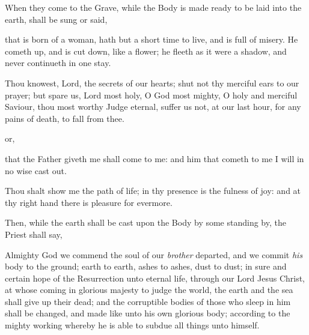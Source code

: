 \begin{rubric}
    When they come to the Grave, while the Body is made ready to be laid into the earth, shall be sung or said,
\end{rubric}\par
{}
 that is born of a woman, hath but a short time to live, and is full of misery. He cometh up, and is cut down, like a flower; he fleeth as it were a shadow, and never continueth in one stay.\par
{}
    Thou knowest, Lord, the secrets of our hearts; shut not thy merciful ears to our prayer; but spare us, Lord most holy, O God most mighty, O holy and merciful Saviour, thou most worthy Judge eternal, suffer us not, at our last hour, for any pains of death, to fall from thee.
\begin{inhead}
    or,
\end{inhead}
 that the Father giveth me shall come to me: and him that cometh to me I will in no wise cast out.\par
    Thou shalt show me the path of life; in thy presence is the fulness of joy: and at thy right hand there is pleasure for evermore.

\begin{rubric}
    Then, while the earth shall be cast upon the Body by some standing by, the Priest shall say,
\end{rubric}
 Almighty God we commend the soul of our \textit{brother} departed, and we commit \textit{his} body to the ground; earth to earth, ashes to ashes, dust to dust; in sure and certain hope of the Resurrection unto eternal life, through our Lord Jesus Christ, at whose coming in glorious majesty to judge the world, the earth and the sea shall give up their dead; and the corruptible bodies of those who sleep in him shall be changed, and made like unto his own glorious body; according to the mighty working whereby he is able to subdue all things unto himself.

